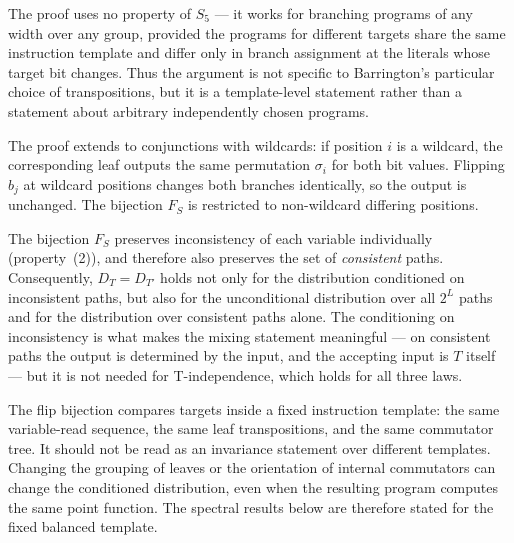 \documentclass[version=final]{iacrcc}
\begin{document}
\begin{remark}
The proof uses no property of $S_5$ --- it works for branching programs of
any width over any group, provided the programs for different targets share the
same instruction template and differ only in branch assignment at the literals
whose target bit changes. Thus the argument is not specific to Barrington's
particular choice of transpositions, but it is a template-level statement rather
than a statement about arbitrary independently chosen programs.
\end{remark}

\begin{remark}
The proof extends to conjunctions with wildcards: if position $i$ is a wildcard,
the corresponding leaf outputs the same permutation $\sigma_i$ for both bit values.
Flipping $b_j$ at wildcard positions changes both branches identically, so the output
is unchanged. The bijection $F_S$ is restricted to non-wildcard differing positions.
\end{remark}

\begin{remark}
\label{rem:unconditional}
The bijection $F_S$ preserves inconsistency of each variable individually
(property~(2)), and therefore also preserves the set of \emph{consistent}
paths. Consequently, $D_T = D_{T'}$ holds not only for the distribution
conditioned on inconsistent paths, but also for the unconditional distribution
over all $2^L$ paths and for the distribution over consistent paths alone.
The conditioning on inconsistency is what makes the mixing statement meaningful
--- on consistent paths the output is determined by the input, and the accepting
input is $T$ itself --- but it is not needed for T-independence, which holds for
all three laws.
\end{remark}

\begin{remark}
\label{rem:grouping}
The flip bijection compares targets inside a fixed instruction template: the
same variable-read sequence, the same leaf transpositions, and the same
commutator tree. It should not be read as an invariance statement over different
templates. Changing the grouping of leaves or the orientation of internal
commutators can change the conditioned distribution, even when the resulting
program computes the same point function. The spectral results below are
therefore stated for the fixed balanced template.
\end{remark}
\end{document}
